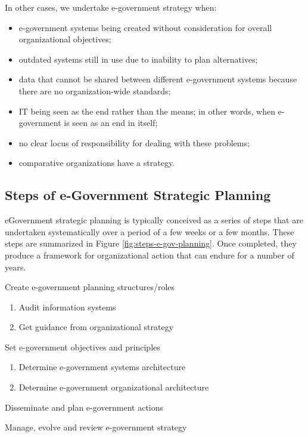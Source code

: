 In other cases, we undertake e-government strategy when:
\begin{itemize}
	 \item e-government systems being created without consideration for overall organizational objectives;
	\item outdated systems still in use due to inability to plan alternatives;
	\item data that cannot be shared between different e-government systems because
	there are no organization-wide standards;
	\item IT being seen as the end rather than the means; in other words, when
	e-government is seen as an end in itself;
	\item no clear locus of responsibility for dealing with these problems;
	\item comparative organizations have a strategy.
\end{itemize}

\subsection{Steps of e-Government Strategic Planning}
eGovernment strategic planning is typically conceived as a series of steps that are
undertaken systematically over a period of a few weeks or a few months. These steps are
summarized in Figure \ref{fig:steps-e-gov-planning}. Once completed, they produce a framework for organizational action that can endure for a number of years.

\begin{steps}
	\item Create e-government planning structures/roles
	\item 
	\begin{enumerate}[label=\alph*.]
		\item Audit information	systems
		\item Get guidance from	organizational strategy
	\end{enumerate}
	\item Set e-government objectives and principles
	\item 
	\begin{enumerate}[label=\alph*.]
		\item Determine e-government systems architecture
		\item Determine e-government organizational architecture
	\end{enumerate}
	
	\item Disseminate and plan e-government actions
	\item Manage, evolve and review e-government strategy
	
\end{steps}

